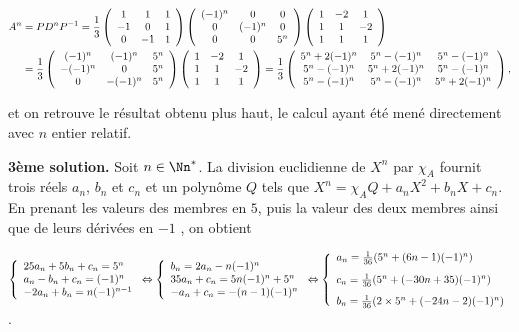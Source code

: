 {{\begin{align*}\ensuremath 
A^n&= PD^nP^{-1}=\frac{1}{3}\left(
\begin{array}{ccc}
1&1&1\\
-1&0&1\\
0&-1&1
\end{array}
\right)\left(
\begin{array}{ccc}
(-1)^n&0&0\\
0&(-1)^n&0\\
0&0&5^n
\end{array}
\right)\left(
\begin{array}{ccc}
1&-2&1\\
1&1&-2\\
1&1&1
\end{array}
\right)\\
 &=\frac{1}{3}\left(
\begin{array}{ccc}
(-1)^n&(-1)^n&5^n\\
-(-1)^n&0&5^n\\
0&-(-1)^n&5^n
\end{array}
\right)\left(
\begin{array}{ccc}
1&-2&1\\
1&1&-2\\
1&1&1
\end{array}
\right)=\frac{1}{3}\left(\begin{array}{ccc}
5^n+2(-1)^n&5^n-(-1)^n&5^n-(-1)^n\\
5^n-(-1)^n&5^n+2(-1)^n&5^n-(-1)^n\\
5^n-(-1)^n&5^n-(-1)^n&5^n+2(-1)^n
\end{array}
\right),
\end{align*}

et on retrouve le résultat obtenu plus haut, le calcul ayant été mené directement avec $n$ entier relatif.

\textbf{3ème solution.} Soit $n\in\Nn^*$. La division euclidienne de $X^n$ par $\chi_A$ fournit trois réels $a_n$, $b_n$ et $c_n$ et un polynôme $Q$ tels que $X^n=\chi_AQ+a_nX^2+b_nX+c_n$. En prenant les valeurs des membres en $5$, puis la valeur des deux membres ainsi que de leurs dérivées en $-1$ , on obtient

\begin{center}
$\left\{
\begin{array}{l}
25a_n+5b_n+c_n=5^n\\
a_n-b_n+c_n=(-1)^n\\
-2a_n+b_n=n(-1)^{n-1}
\end{array}
\right.\Leftrightarrow\left\{
\begin{array}{l}
b_n=2a_n-n(-1)^{n}\\
35a_n+c_n=5n(-1)^{n}+5^n\\
-a_n+c_n=-(n-1)(-1)^n
\end{array}
\right.\Leftrightarrow\left\{
\begin{array}{l}
a_n=\frac{1}{36}(5^n+(6n-1)(-1)^n)\\
\rule[-4mm]{0mm}{10mm}c_n=\frac{1}{36}(5^n+(-30n+35)(-1)^n)\\
b_n=\frac{1}{36}(2\times5^n+(-24n-2)(-1)^n)
\end{array}
\right.$.
\end{center}
 

}}
